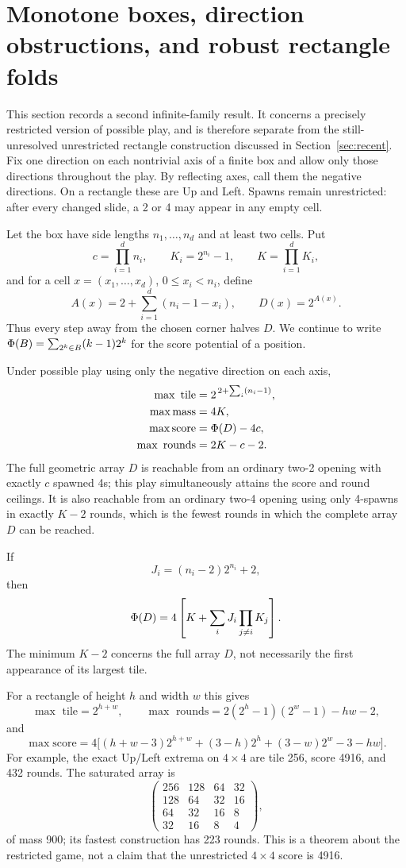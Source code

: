 \section{Monotone boxes, direction obstructions, and robust rectangle folds}\label{sec:monotone}

This section records a second infinite-family result.  It concerns a
precisely restricted version of possible play, and is therefore separate
from the still-unresolved unrestricted rectangle construction discussed
in Section~\ref{sec:recent}.  Fix one direction on each nontrivial axis of
a finite box and allow only those directions throughout the play.  By
reflecting axes, call them the negative directions.  On a rectangle these
are Up and Left.  Spawns remain unrestricted: after every changed slide,
a 2 or 4 may appear in any empty cell.

Let the box have side lengths $n_1,\ldots,n_d$ and at least two cells.  Put
\[
 c=\prod_{i=1}^d n_i,\qquad K_i=2^{n_i}-1,\qquad
 K=\prod_{i=1}^d K_i,
\]
and for a cell $x=(x_1,\ldots,x_d)$, $0\le x_i<n_i$, define
\[
 A(x)=2+\sum_{i=1}^d(n_i-1-x_i),\qquad
 D(x)=2^{A(x)}.
\]
Thus every step away from the chosen corner halves $D$.  We continue to
write $\Phi(B)=\sum_{2^k\in B}(k-1)2^k$ for the score potential of a
position.

\begin{theorem}\label{thm:monotone}
Under possible play using only the negative direction on each axis,
\begin{align*}
 \max\text{ tile}&=2^{\,2+\sum_i(n_i-1)},\\
 \max\mathrm{mass}&=4K,\\
 \max\mathrm{score}&=\Phi(D)-4c,\\
 \max\text{ rounds}&=2K-c-2.
\end{align*}
The full geometric array $D$ is reachable from an ordinary two-2 opening
with exactly $c$ spawned 4s; this play simultaneously attains the score
and round ceilings.  It is also reachable from an ordinary two-4 opening
using only 4-spawns in exactly $K-2$ rounds, which is the fewest rounds in
which the complete array $D$ can be reached.

If
\[
 J_i=(n_i-2)2^{n_i}+2,
\]
then
\[
 \Phi(D)=4\left[K+\sum_iJ_i\prod_{j\ne i}K_j\right].
\]
The minimum $K-2$ concerns the full array $D$, not necessarily the first
appearance of its largest tile.
\end{theorem}

For a rectangle of height $h$ and width $w$ this gives
\[
 \max\text{ tile}=2^{h+w},\qquad
 \max\text{ rounds}=2(2^h-1)(2^w-1)-hw-2,
\]
and
\[
 \max\mathrm{score}=4\big[(h+w-3)2^{h+w}+(3-h)2^h
 +(3-w)2^w-3-hw\big].
\]
For example, the exact Up/Left extrema on $4\times4$ are tile 256,
score 4916, and 432 rounds.  The saturated array is
\[
\begin{pmatrix}
256&128&64&32\\
128&64&32&16\\
64&32&16&8\\
32&16&8&4
\end{pmatrix},
\]
of mass 900; its fastest construction has 223 rounds.  This is a theorem
about the restricted game, not a claim that the unrestricted $4\times4$
score is 4916.

